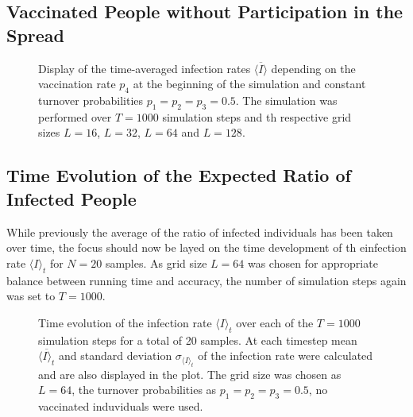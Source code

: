 \subsection{Vaccinated People without Participation in the Spread}

\begin{figure}[ht]
    \centering
    \resizebox{\textwidth}{!}{}
    \caption{Display of the time-averaged infection rates $\overline{\langle I\rangle}$ depending on the vaccination rate $p_4$ at the beginning of the simulation and constant turnover probabilities
    $p_1=p_2=p_3=0.5$. The simulation was performed over $T=1000$ simulation steps and th respective grid sizes $L=16$, $L=32$, $L=64$ and $L=128$.}\label{fig:Res_Dis_Avg_Inf_over_p4}
\end{figure}

\subsection{Time Evolution of the Expected Ratio of Infected People}

While previously the average of the ratio of infected individuals has been taken over time, the focus should now be layed on the time development of th einfection rate $\langle I\rangle_t$ for $N=20$ samples.
As grid size $L=64$ was chosen for appropriate balance between running time and accuracy, the number of simulation steps again was set to $T=1000$.


\begin{figure}[ht]
    \centering
    \resizebox{\textwidth}{!}{}
    \caption{Time evolution of the infection rate $\langle I\rangle_t$ over each of the $T=1000$ simulation steps for a total of 20 samples. At each timestep mean $\overline{\langle I\rangle_t}$
    and standard deviation $\sigma_{\langle I\rangle_t}$ of the infection rate were calculated and are also displayed in the plot. The grid size was chosen as $L=64$, the turnover probabilities
    as $p_1=p_2=p_3=0.5$, no vaccinated induviduals were used.}\label{fig:Avg_Inf_over_t}
\end{figure}

